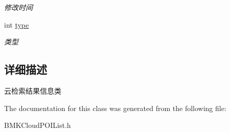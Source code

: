 \begin{DoxyCompactItemize}
\begin{DoxyCompactList}\small\item\em 修改时间 \end{DoxyCompactList}\item 
\hypertarget{interface_b_m_k_cloud_p_o_i_info_a7a51645c4ec8dcfa08ae4624749878cb}{int \hyperlink{interface_b_m_k_cloud_p_o_i_info_a7a51645c4ec8dcfa08ae4624749878cb}{type}}\label{interface_b_m_k_cloud_p_o_i_info_a7a51645c4ec8dcfa08ae4624749878cb}

\begin{DoxyCompactList}\small\item\em 类型 \end{DoxyCompactList}\end{DoxyCompactItemize}


\subsection{详细描述}
云检索结果信息类 

The documentation for this class was generated from the following file\-:\begin{DoxyCompactItemize}
\item 
B\-M\-K\-Cloud\-P\-O\-I\-List.\-h\end{DoxyCompactItemize}
